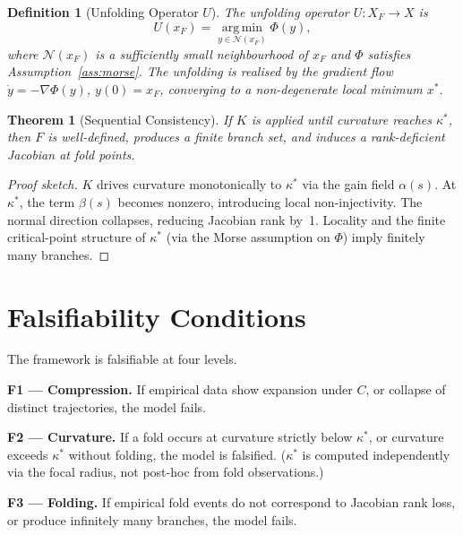 \documentclass[12pt,a4paper]{article}
\newtheorem{theorem}{Theorem}[section]
\newtheorem{definition}{Definition}[section]
\begin{document}
\begin{definition}[Unfolding Operator $U$]
\label{def:U}
The \emph{unfolding operator} $U : X_F \to X$ is
\[
  U(x_F) = \operatorname*{arg\,min}_{y \in \mathcal{N}(x_F)} \Phi(y),
\]
where $\mathcal{N}(x_F)$ is a sufficiently small neighbourhood of
$x_F$ and $\Phi$ satisfies Assumption~\ref{ass:morse}.
The unfolding is realised by the gradient flow
$\dot{y} = -\nabla\Phi(y)$, $y(0) = x_F$,
converging to a non-degenerate local minimum $x^*$.
\end{definition}

\begin{theorem}[Sequential Consistency]
\label{thm:consistency}
If $K$ is applied until curvature reaches $\kappa^*$, then $F$ is
well-defined, produces a finite branch set, and induces a rank-deficient
Jacobian at fold points.
\end{theorem}

\begin{proof}[Proof sketch]
$K$ drives curvature monotonically to $\kappa^*$ via the gain field
$\alpha(s)$.
At $\kappa^*$, the term $\beta(s)$ becomes nonzero, introducing local
non-injectivity.
The normal direction collapses, reducing Jacobian rank by~1.
Locality and the finite critical-point structure of $\kappa^*$ (via the
Morse assumption on $\Phi$) imply finitely many branches.
\end{proof}

\section{Falsifiability Conditions}
\label{sec:falsifiability}

The framework is falsifiable at four levels.

\textbf{F1 --- Compression.}
If empirical data show expansion under $C$, or collapse of distinct
trajectories, the model fails.

\textbf{F2 --- Curvature.}
If a fold occurs at curvature strictly below $\kappa^*$, or curvature
exceeds $\kappa^*$ without folding, the model is falsified.
($\kappa^*$ is computed independently via the focal radius, not
post-hoc from fold observations.)

\textbf{F3 --- Folding.}
If empirical fold events do not correspond to Jacobian rank loss,
or produce infinitely many branches, the model fails.
\end{document}

